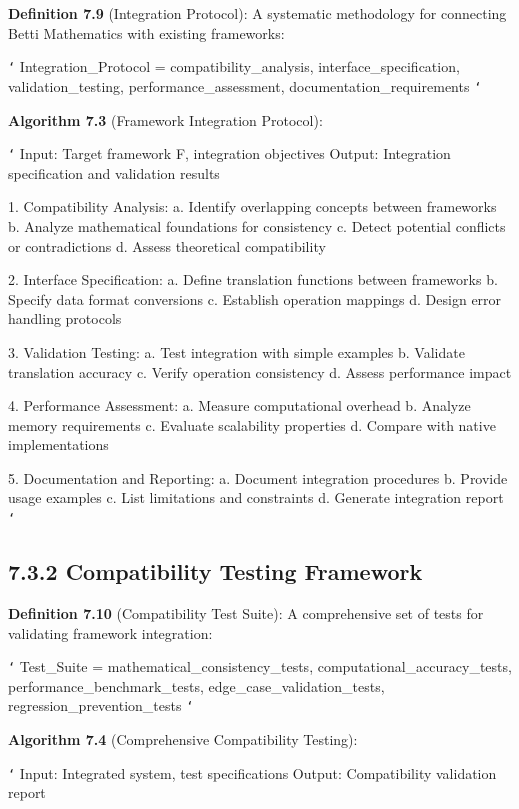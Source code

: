 \textbf{Definition 7.9} (Integration Protocol): A systematic methodology for connecting Betti Mathematics with existing frameworks:

\texttt{`}
Integration_Protocol = {
    compatibility_analysis,
    interface_specification,
    validation_testing,
    performance_assessment,
    documentation_requirements
}
\texttt{`}

\textbf{Algorithm 7.3} (Framework Integration Protocol):

\texttt{`}
Input: Target framework F, integration objectives
Output: Integration specification and validation results

1. Compatibility Analysis:
   a. Identify overlapping concepts between frameworks
   b. Analyze mathematical foundations for consistency
   c. Detect potential conflicts or contradictions
   d. Assess theoretical compatibility
   
2. Interface Specification:
   a. Define translation functions between frameworks
   b. Specify data format conversions
   c. Establish operation mappings
   d. Design error handling protocols
   
3. Validation Testing:
   a. Test integration with simple examples
   b. Validate translation accuracy
   c. Verify operation consistency
   d. Assess performance impact
   
4. Performance Assessment:
   a. Measure computational overhead
   b. Analyze memory requirements
   c. Evaluate scalability properties
   d. Compare with native implementations
   
5. Documentation and Reporting:
   a. Document integration procedures
   b. Provide usage examples
   c. List limitations and constraints
   d. Generate integration report
\texttt{`}

\subsection{7.3.2 Compatibility Testing Framework}

\textbf{Definition 7.10} (Compatibility Test Suite): A comprehensive set of tests for validating framework integration:

\texttt{`}
Test_Suite = {
    mathematical_consistency_tests,
    computational_accuracy_tests,
    performance_benchmark_tests,
    edge_case_validation_tests,
    regression_prevention_tests
}
\texttt{`}

\textbf{Algorithm 7.4} (Comprehensive Compatibility Testing):

\texttt{`}
Input: Integrated system, test specifications
Output: Compatibility validation report

